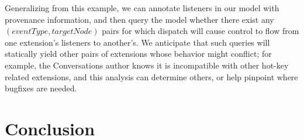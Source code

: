 \documentclass[letterpaper,10pt,twocolumn]{article}
\let\theendnotes\relax
\begin{document}
Generalizing from this example, we can annotate listeners in our model
with provenance information, and then query the model whether there
exist any $(\mathit{eventType}, \mathit{targetNode})$ pairs for which
dispatch will cause control to flow from one extension's listeners to
another's.  We anticipate that such queries will statically yield
other pairs of extensions whose behavior might conflict; for example,
the Conversations author knows it is incompatible with other hot-key
related extensions, and this analysis can determine others, or help
pinpoint where bugfixes are needed.

\section{Conclusion}\label{sec:conclusion}
\lipsum[1]

%
%

%
%

{\footnotesize 

\lipsum[1-3]}

\theendnotes
\end{document}
